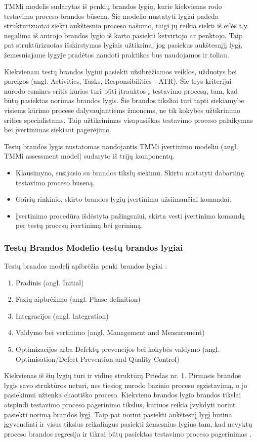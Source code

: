 \documentclass{VUMIFPSkursinis}
\begin{document}
TMMi modelis sudarytas iš penkių brandos lygių, kurie kiekvienas rodo testavimo proceso brandos būseną. Šie modelio nustatyti lygiai padeda struktūrizuotai siekti aukštesnio proceso našumo, taigi jų reikia siekti iš eilės t.y. negalima iš antrojo brandos lygio iš karto pasiekti ketvirtojo ar penktojo. Taip pat struktūrizuotas išskirstymas lygiais užtikrina, jog pasiekus aukštesnįjį lygį, žemesniajame lygyje pradėtos naudoti praktikos bus naudojamos ir toliau.

Kiekvienam testų brandos lygiui pasiekti užsibrėžiamos veiklos, užduotys bei pareigos (angl. Activities, Tasks, Responsibilities - ATR). Šie trys kriterijai nurodo esmines sritis kurios turi būti įtrauktos į testavimo procesą, tam, kad būtų pasiektas norimas brandos lygis. Šie brandos tiksliai turi tapti siekiamybe visiems kūrimo procese dalyvaujantiems žmonėms, ne tik kokybės užtikrinimo srities specialistams. Taip užtikrinimas visapusiškas testavimo proceso palaikymas bei įvertinimas siekiant pagerėjimo.

Testų brandos lygis nustatomas naudojantis TMMi įvertinimo modeliu (angl. TMMi assessment model) sudaryto iš trijų komponentų.
\begin{itemize}
   \item Klausimyno, susijusio su brandos tikslų siekimu. Skirtu nustatyti dabartinę testavimo proceso būseną.
   \item Gairių rinkinio, skirto brandos lygių įvertinimu užsiimančiai komandai.
   \item Įvertinimo procedūra išdėstyta pažingsniui, skirta vesti įvertinimo komandą per testų procesų įvertinimą bei gerinimą.
\end{itemize}

\subsubsection{Testų Brandos Modelio testų brandos lygiai}
Testų brandos modelį apibrėžia penki brandos lygiai \cite{Burnstein:2010:PST:1965566}:
\begin{enumerate}
   \item Pradinis (angl. Initial)
   \item Fazių aipbrėžimo (angl. Phase definition)
   \item Integracijos (angl. Integration)
   \item Valdymo bei vertinimo (angl. Management and Measurement)
   \item Optimizacijos arba Defektų prevencijos bei kokybės valdymo (angl. Optimisation/Defect Prevention and Quality Control)
\end{enumerate}
Kiekvienas iš šių lygių turi ir vidinę struktūrą Priedas nr. 1. Pirmasis brandos lygis savo struktūros neturi, nes tiesiog nurodo bazinio proceso egzistavimą, o jo pasiekimui užtenka chaotiško proceso. Kiekvieno brandos lygio brandos tikslai atspindi testavimo proceso pagerinimo tikslus, kuriuos reikia įvykdyti norint pasiekti norimą brandos lygį. Taip pat norint pasiekti aukštesnį lygį būtina įgyvendinti ir visus tikslus reikalingus pasiekti žemesnius lygius tam, kad nevyktų proceso brandos regresija ir tikrai būtų pasiektas testavimo proceso pagerinimas \cite{Tmmi}.
\end{document}
